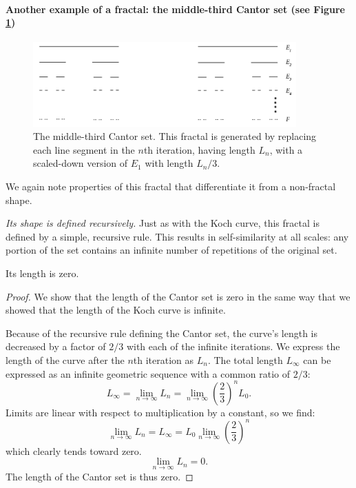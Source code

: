 \paragraph{Another example of a fractal: the middle-third Cantor set (see Figure \ref{fig:cantorset})}

\begin{figure}[ht]
\centering
\includegraphics[width=0.9\textwidth]{Chapters/Figures/cantorset.png} 
\caption[Middle-third Cantor set]{The middle-third Cantor set. This fractal is generated by replacing each line segment in the $n$th iteration, having length $L_n$, with a scaled-down version of $E_1$ with length $L_n/3$.}\label{fig:cantorset}
\end{figure}

We again note properties of this fractal that differentiate it from a non-fractal shape.

\begin{myobs}\textit{Its shape is defined recursively.} Just as with the Koch curve, this fractal is defined by a simple, recursive rule. This results in self-similarity at all scales: any portion of the set contains an infinite number of repetitions of the original set.\end{myobs}

\begin{myobs}Its length is zero.\end{myobs}
\begin{proof}
We show that the length of the Cantor set is zero in the same way that we showed that the length of the Koch curve is infinite. 

Because of the recursive rule defining the Cantor set, the curve's length is decreased by a factor of $ 2/3 $ with each of the infinite iterations. We express the length of the curve after the $n$th iteration as $L_n$. The total length $L_\infty$ can be expressed as an infinite geometric sequence with a common ratio of $ 2/3 $:
\begin{equation}
	L_\infty = \lim_{n \to \infty}L_n = \lim_{n \to \infty}\left(\frac{2}{3}\right)^n L_0.
\end{equation}
Limits are linear with respect to multiplication by a constant, so we find:
\begin{equation}
	\lim_{n \to \infty}L_n = L_\infty = L_0 \lim_{n \to \infty} \left(\frac{2}{3}\right)^n
\end{equation}
which clearly tends toward zero.
\begin{equation}
	\lim_{n \to \infty}L_n = 0. 
\end{equation}
The length of the Cantor set is thus zero.
\end{proof}

